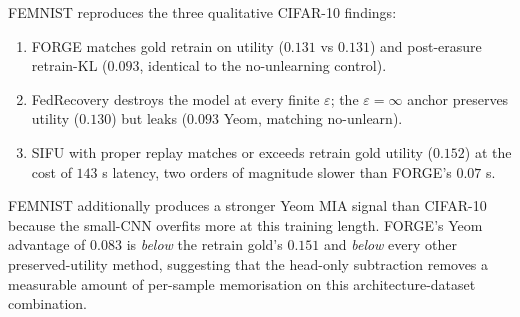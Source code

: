 FEMNIST reproduces the three qualitative CIFAR-10 findings:
\begin{enumerate}[leftmargin=*,itemsep=0pt]
\item FORGE matches gold retrain on utility ($0.131$ vs $0.131$) and
      post-erasure retrain-KL ($0.093$, identical to the no-unlearning
      control).
\item FedRecovery destroys the model at every finite $\varepsilon$; the
      $\varepsilon = \infty$ anchor preserves utility ($0.130$) but
      leaks ($0.093$ Yeom, matching no-unlearn).
\item SIFU with proper replay matches or exceeds retrain gold utility
      ($0.152$) at the cost of $143$ s latency, two orders of magnitude
      slower than FORGE's $0.07$ s.
\end{enumerate}
FEMNIST additionally produces a stronger Yeom MIA signal than CIFAR-10
because the small-CNN overfits more at this training length. FORGE's
Yeom advantage of $0.083$ is \emph{below} the retrain gold's $0.151$ and
\emph{below} every other preserved-utility method, suggesting that the
head-only subtraction removes a measurable amount of per-sample
memorisation on this architecture-dataset combination.
